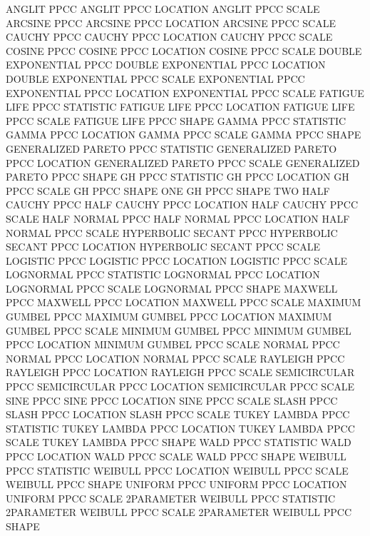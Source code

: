    ANGLIT PPCC
   ANGLIT PPCC LOCATION
   ANGLIT PPCC SCALE
   ARCSINE PPCC
   ARCSINE PPCC LOCATION
   ARCSINE PPCC SCALE
   CAUCHY PPCC
   CAUCHY PPCC LOCATION
   CAUCHY PPCC SCALE
   COSINE PPCC
   COSINE PPCC LOCATION
   COSINE PPCC SCALE
   DOUBLE EXPONENTIAL PPCC
   DOUBLE EXPONENTIAL PPCC LOCATION
   DOUBLE EXPONENTIAL PPCC SCALE
   EXPONENTIAL PPCC
   EXPONENTIAL PPCC LOCATION
   EXPONENTIAL PPCC SCALE
   FATIGUE LIFE PPCC STATISTIC
   FATIGUE LIFE PPCC LOCATION
   FATIGUE LIFE PPCC SCALE
   FATIGUE LIFE PPCC SHAPE
   GAMMA PPCC STATISTIC
   GAMMA PPCC LOCATION
   GAMMA PPCC SCALE
   GAMMA PPCC SHAPE
   GENERALIZED PARETO PPCC STATISTIC
   GENERALIZED PARETO PPCC LOCATION
   GENERALIZED PARETO PPCC SCALE
   GENERALIZED PARETO PPCC SHAPE
   GH PPCC STATISTIC
   GH PPCC LOCATION
   GH PPCC SCALE
   GH PPCC SHAPE ONE
   GH PPCC SHAPE TWO
   HALF CAUCHY PPCC
   HALF CAUCHY PPCC LOCATION
   HALF CAUCHY PPCC SCALE
   HALF NORMAL PPCC
   HALF NORMAL PPCC LOCATION
   HALF NORMAL PPCC SCALE
   HYPERBOLIC SECANT PPCC
   HYPERBOLIC SECANT PPCC LOCATION
   HYPERBOLIC SECANT PPCC SCALE
   LOGISTIC PPCC
   LOGISTIC PPCC LOCATION
   LOGISTIC PPCC SCALE
   LOGNORMAL PPCC STATISTIC
   LOGNORMAL PPCC LOCATION
   LOGNORMAL PPCC SCALE
   LOGNORMAL PPCC SHAPE
   MAXWELL PPCC
   MAXWELL PPCC LOCATION
   MAXWELL PPCC SCALE
   MAXIMUM GUMBEL PPCC
   MAXIMUM GUMBEL PPCC LOCATION
   MAXIMUM GUMBEL PPCC SCALE
   MINIMUM GUMBEL PPCC
   MINIMUM GUMBEL PPCC LOCATION
   MINIMUM GUMBEL PPCC SCALE
   NORMAL PPCC
   NORMAL PPCC LOCATION
   NORMAL PPCC SCALE
   RAYLEIGH PPCC
   RAYLEIGH PPCC LOCATION
   RAYLEIGH PPCC SCALE
   SEMICIRCULAR PPCC
   SEMICIRCULAR PPCC LOCATION
   SEMICIRCULAR PPCC SCALE
   SINE PPCC
   SINE PPCC LOCATION
   SINE PPCC SCALE
   SLASH PPCC
   SLASH PPCC LOCATION
   SLASH PPCC SCALE
   TUKEY LAMBDA PPCC STATISTIC
   TUKEY LAMBDA PPCC LOCATION
   TUKEY LAMBDA PPCC SCALE
   TUKEY LAMBDA PPCC SHAPE
   WALD PPCC STATISTIC
   WALD PPCC LOCATION
   WALD PPCC SCALE
   WALD PPCC SHAPE
   WEIBULL PPCC STATISTIC
   WEIBULL PPCC LOCATION
   WEIBULL PPCC SCALE
   WEIBULL PPCC SHAPE
   UNIFORM PPCC
   UNIFORM PPCC LOCATION
   UNIFORM PPCC SCALE
   2PARAMETER WEIBULL PPCC STATISTIC
   2PARAMETER WEIBULL PPCC SCALE
   2PARAMETER WEIBULL PPCC SHAPE

